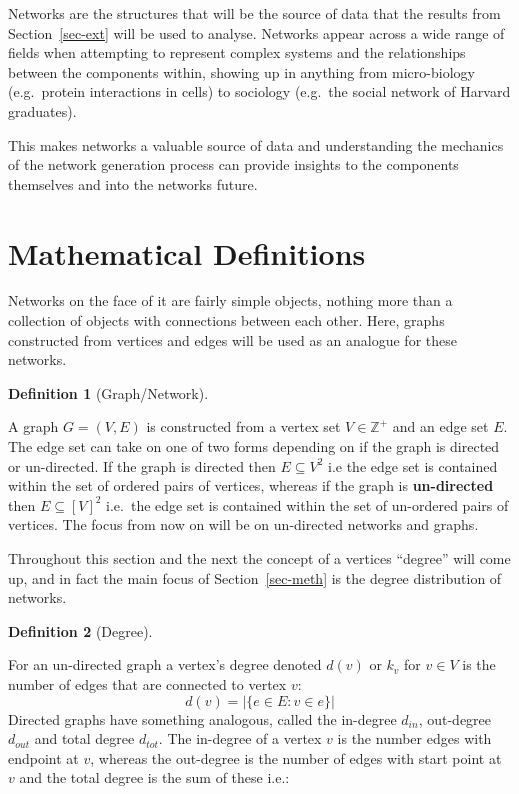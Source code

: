 \documentclass[
  10pt,
  a4paper,
]{scrreprt}
\theoremstyle{definition}
\newtheorem{definition}{Definition}[section]
\theoremstyle{plain}
\theoremstyle{remark}
\begin{document}
{Networks are the structures that will be the source of data that the
results from Section~\ref{sec-ext} will be used to analyse. Networks
appear across a wide range of fields when attempting to represent
complex systems and the relationships between the components within,
showing up in anything from micro-biology (e.g.~protein interactions in
cells) to sociology (e.g.~the social network of Harvard graduates).

This makes networks a valuable source of data and understanding the
mechanics of the network generation process can provide insights to the
components themselves and into the networks future.

\hypertarget{mathematical-definitions}{%
\section{Mathematical Definitions}\label{mathematical-definitions}}

Networks on the face of it are fairly simple objects, nothing more than
a collection of objects with connections between each other. Here,
graphs constructed from vertices and edges will be used as an analogue
for these networks.

\begin{definition}[Graph/Network]\protect\hypertarget{def-net}{}\label{def-net}

A graph \(G = (V,E)\) is constructed from a vertex set
\(V\in\mathbb Z^+\) and an edge set \(E\). The edge set can take on one
of two forms depending on if the graph is directed or un-directed. If
the graph is directed then \(E\subseteq V^2\) i.e the edge set is
contained within the set of ordered pairs of vertices, whereas if the
graph is \textbf{un-directed} then \(E\subseteq [V]^2\) i.e.~the edge
set is contained within the set of un-ordered pairs of vertices. The
focus from now on will be on un-directed networks and graphs.

\end{definition}

Throughout this section and the next the concept of a vertices
``degree'' will come up, and in fact the main focus of
Section~\ref{sec-meth} is the degree distribution of networks.

\begin{definition}[Degree]\protect\hypertarget{def-deg}{}\label{def-deg}

For an un-directed graph a vertex's degree denoted \(d(v)\) or \(k_v\)
for \(v\in V\) is the number of edges that are connected to vertex
\(v\): \[
d(v) = |\{e\in E : v \in e\}|
\] Directed graphs have something analogous, called the in-degree
\(d_{in}\), out-degree \(d_{out}\) and total degree \(d_{tot}\). The
in-degree of a vertex \(v\) is the number edges with endpoint at \(v\),
whereas the out-degree is the number of edges with start point at \(v\)
and the total degree is the sum of these i.e.:


\end{definition}}
\end{document}
